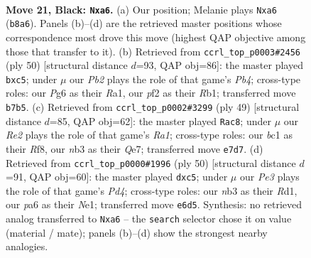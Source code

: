 \documentclass[11pt]{article}
\begin{document}
\clearpage

\begin{figure}[p]\centering
\begin{subfigure}{0.46\textwidth}\centering
\resizebox{\linewidth}{!}{%
\newchessgame
\chessboard[
  setfen={rn4k1/ppq1r2p/P3p1p1/2bB4/6PP/1N6/1P3P2/R1BQ1RK1 b - - 0 21},
  showmover=false,
  pgfstyle=straightmove, color=movearrow, markmove={b8-a6}
]}
\caption{}
\end{subfigure}\hfill
\begin{subfigure}{0.46\textwidth}\centering
\resizebox{\linewidth}{!}{%
\newchessgame
\chessboard[
  setfen={1rb1rbk1/5p2/3q1n1p/1pp1p1p1/1P3BP1/2N4P/4PPB1/RRQ3K1 w - - 0 26},
  showmover=false,
  pgfstyle=straightmove, color=movearrow, markmove={b4-c5}
]}
\caption{}
\end{subfigure}
\\[4pt]
\begin{subfigure}{0.46\textwidth}\centering
\resizebox{\linewidth}{!}{%
\newchessgame
\chessboard[
  setfen={r4rk1/p3qp2/3p1b1P/nNBP2p1/1p4P1/8/PP1RB3/2K3QR b - - 0 25},
  showmover=false,
  pgfstyle=straightmove, color=movearrow, markmove={a8-c8}
]}
\caption{}
\end{subfigure}\hfill
\begin{subfigure}{0.46\textwidth}\centering
\resizebox{\linewidth}{!}{%
\newchessgame
\chessboard[
  setfen={b1qr2k1/p1nr1pp1/4p2p/2b1P3/3P2QP/P5P1/5PB1/1R1RN1K1 w - - 0 26},
  showmover=false,
  pgfstyle=straightmove, color=movearrow, markmove={d4-c5}
]}
\caption{}
\end{subfigure}
\caption{\textbf{Move 21, Black: \texttt{Nxa6}.} (a) Our position; Melanie plays \texttt{Nxa6} (\texttt{b8a6}). Panels (b)--(d) are the retrieved master positions whose correspondence most drove this move (highest QAP objective among those that transfer to it). (b) Retrieved from \texttt{ccrl\_top\_p0003\#2456} (ply 50) [structural distance $d$=93, QAP obj=86]: the master played \texttt{bxc5}; under $\mu$ our \emph{Pb2} plays the role of that game's \emph{Pb4}; cross-type roles: our \emph{P}g6 as their \emph{R}a1, our \emph{p}f2 as their \emph{R}b1; transferred move \texttt{b7b5}. (c) Retrieved from \texttt{ccrl\_top\_p0002\#3299} (ply 49) [structural distance $d$=85, QAP obj=62]: the master played \texttt{Rac8}; under $\mu$ our \emph{Re2} plays the role of that game's \emph{Ra1}; cross-type roles: our \emph{b}c1 as their \emph{R}f8, our \emph{n}b3 as their \emph{Q}e7; transferred move \texttt{e7d7}. (d) Retrieved from \texttt{ccrl\_top\_p0000\#1996} (ply 50) [structural distance $d$=91, QAP obj=60]: the master played \texttt{dxc5}; under $\mu$ our \emph{Pe3} plays the role of that game's \emph{Pd4}; cross-type roles: our \emph{n}b3 as their \emph{R}d1, our \emph{p}a6 as their \emph{N}e1; transferred move \texttt{e6d5}. Synthesis: no retrieved analog transferred to \texttt{Nxa6} -- the \texttt{search} selector chose it on value (material / mate); panels (b)--(d) show the strongest nearby analogies.}
\label{fig:thought-m41}
\end{figure}
\end{document}
